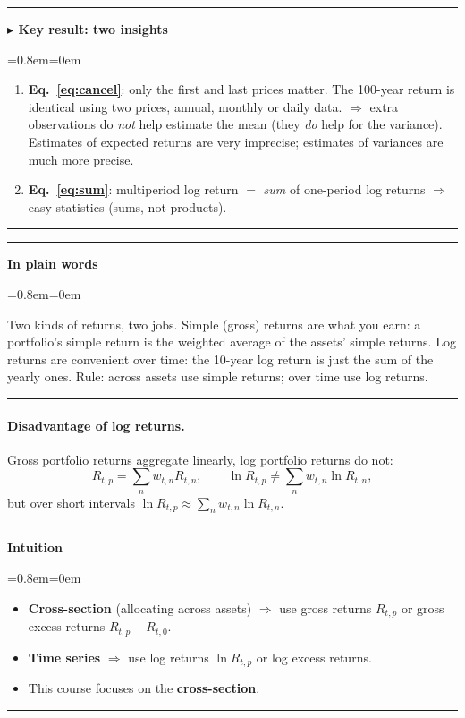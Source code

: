 \documentclass[11pt,a4paper]{report}
\newenvironment{notebox}[1]
  {\par\medskip\Needspace{6\baselineskip}\noindent\rule{\linewidth}{0.4pt}\par\nopagebreak
   \noindent\textbf{#1}\par\nopagebreak
   \begin{list}{}{\leftmargin=0.8em\rightmargin=0em\topsep=2pt}\item[]}
  {\end{list}\nopagebreak\noindent\rule{\linewidth}{0.4pt}\par\medskip}
\newenvironment{keybox}[1][]{\begin{notebox}{$\blacktriangleright$ Key result#1}}{\end{notebox}}
\newenvironment{intuition}{\begin{notebox}{Intuition}}{\end{notebox}}
\newenvironment{plainbox}{\begin{notebox}{In plain words}}{\end{notebox}}
\begin{document}
\begin{keybox}[: two insights]
\begin{enumerate}
  \item \textbf{Eq.~\eqref{eq:cancel}}: only the first and last prices matter.
    The 100-year return is identical using two prices, annual, monthly or daily
    data. $\Rightarrow$ extra observations do \emph{not} help estimate the mean
    (they \emph{do} help for the variance). Estimates of expected returns are
    very imprecise; estimates of variances are much more precise.
  \item \textbf{Eq.~\eqref{eq:sum}}: multiperiod log return $=$ \emph{sum} of
    one-period log returns $\Rightarrow$ easy statistics (sums, not products).
\end{enumerate}
\end{keybox}

\begin{plainbox}
Two kinds of returns, two jobs. Simple (gross) returns are what you earn: a
portfolio's simple return is the weighted average of the assets' simple returns.
Log returns are convenient over time: the 10-year log return is just the sum of
the yearly ones. Rule: across assets use simple returns; over time use log returns.
\end{plainbox}
\paragraph{Disadvantage of log returns.} Gross portfolio returns aggregate
linearly, log portfolio returns do not:
\[
R_{t,p}=\sum_n w_{t,n}R_{t,n}, \qquad
\ln R_{t,p}\neq\sum_n w_{t,n}\ln R_{t,n},
\]
but over short intervals $\ln R_{t,p}\approx\sum_n w_{t,n}\ln R_{t,n}$.
\begin{intuition}
\begin{itemize}
  \item \textbf{Cross-section} (allocating across assets) $\Rightarrow$ use
    gross returns $R_{t,p}$ or gross excess returns $R_{t,p}-R_{t,0}$.
  \item \textbf{Time series} $\Rightarrow$ use log returns $\ln R_{t,p}$ or log
    excess returns.
  \item This course focuses on the \textbf{cross-section}.
\end{itemize}
\end{intuition}
\end{document}
